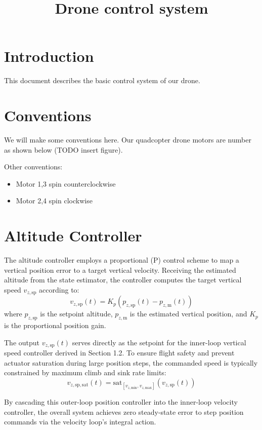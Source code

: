 \documentclass{article}
\title{Drone control system}
\author{}
\date{}
\begin{document}
	
	\maketitle
	\section{Introduction}
	This document describes the basic control system of our drone.
	
	\section{Conventions}
	We will make some conventions here. Our quadcopter drone motors are number as shown below (TODO insert figure).
	
	Other conventions:
	\begin{itemize}
		\item Motor 1,3 spin counterclockwise
		\item Motor 2,4 spin clockwise
	\end{itemize}
	

	\section{Altitude Controller}
	The altitude controller employs a proportional (P) control scheme to map a vertical position error to a target vertical velocity. Receiving the estimated altitude from the state estimator, the controller computes the target vertical speed $v_{z,\mathrm{sp}}$ according to:
	\begin{equation}
		v_{z,\mathrm{sp}}(t) = K_p \left( p_{z,\mathrm{sp}}(t) - p_{z,\mathrm{m}}(t) \right)
	\end{equation}
	where $p_{z,\mathrm{sp}}$ is the setpoint altitude, $p_{z,\mathrm{m}}$ is the estimated vertical position, and $K_p$ is the proportional position gain.
	
	The output $v_{z,\mathrm{sp}}(t)$ serves directly as the setpoint for the inner-loop vertical speed controller derived in Section 1.2. To ensure flight safety and prevent actuator saturation during large position steps, the commanded speed is typically constrained by maximum climb and sink rate limits:
	\begin{equation}
		v_{z,\mathrm{sp,sat}}(t) = \mathrm{sat}_{\left[v_{z,\mathrm{min}}, v_{z,\mathrm{max}}\right]} \left( v_{z,\mathrm{sp}}(t) \right)
	\end{equation}
	
	By cascading this outer-loop position controller into the inner-loop velocity controller, the overall system achieves zero steady-state error to step position commands via the velocity loop's integral action.
	
\end{document}

